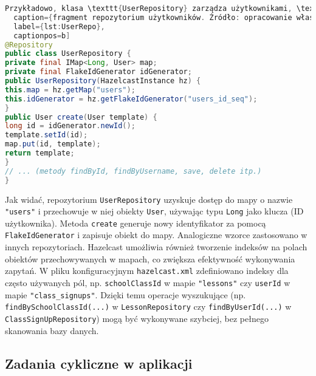 \begin{lstlisting}[language=Java,
  caption={Widok listy lekcji. Źródło: opracowanie własne},
  label={lst:view-lessons},
  captionpos=b]
Przykładowo, klasa \texttt{UserRepository} zarządza użytkownikami, \texttt{PostRepository} – postami, \texttt{LessonRepository} – lekcjami itd. W konstruktorze repozytorium wstrzykiwana jest instancja \texttt{HazelcastInstance}, z której pobierana jest odpowiednia mapa (\texttt{hz.getMap("nazwaMapy")}) oraz generator unikalnych identyfikatorów \texttt{FlakeIdGenerator}. Do generowania identyfikatorów wykorzystano rozproszony mechanizm Hazelcast (flake ID), który zapewnia unikalność w całym klastrze bez ryzyka kolizji \cite{hazelcast-docs}. Dzięki temu każdy nowo tworzony obiekt może otrzymać ID bez potrzeby korzystania z sekwencji bazy danych. Poniżej przedstawiono fragment implementacji repozytorium użytkowników, ilustrujący integrację z Hazelcast: \begin{lstlisting}[language=Java,
  caption={fragment repozytorium użytkowników. Źródło: opracowanie własne},
  label={lst:UserRepo},
  captionpos=b]
@Repository
public class UserRepository {
private final IMap<Long, User> map;
private final FlakeIdGenerator idGenerator;
public UserRepository(HazelcastInstance hz) {
this.map = hz.getMap("users");
this.idGenerator = hz.getFlakeIdGenerator("users_id_seq");
}
public User create(User template) {
long id = idGenerator.newId();
template.setId(id);
map.put(id, template);
return template;
}
// ... (metody findById, findByUsername, save, delete itp.)
}
\end{lstlisting} 
Jak widać, repozytorium \texttt{UserRepository} uzyskuje dostęp do mapy o nazwie
\texttt{"users"} i przechowuje w niej obiekty \texttt{User}, używając typu
\texttt{Long} jako klucza (ID użytkownika). Metoda \texttt{create} generuje nowy
identyfikator za pomocą \texttt{FlakeIdGenerator} i zapisuje obiekt do mapy.
Analogiczne wzorce zastosowano w innych repozytoriach. Hazelcast umożliwia również
tworzenie indeksów na polach obiektów przechowywanych w mapach, co zwiększa
efektywność wykonywania zapytań. W pliku konfiguracyjnym \texttt{hazelcast.xml}
zdefiniowano indeksy dla często używanych pól, np. \texttt{schoolClassId}
w mapie \texttt{"lessons"} czy \texttt{userId} w mapie
\texttt{"class\_signups"}. Dzięki temu operacje wyszukujące (np.
\texttt{findBySchoolClassId(...)} w \texttt{LessonRepository} czy
\texttt{findByUserId(...)} w \texttt{ClassSignUpRepository}) mogą być wykonywane
szybciej, bez pełnego skanowania bazy danych.

\subsection{Zadania cykliczne w aplikacji}

